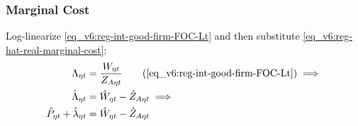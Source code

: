 \documentclass[../thesis.tex]{subfiles}
\begin{document}
\subsubsection*{Marginal Cost}
Log-linearize \ref{eq_v6:reg-int-good-firm-FOC-Lt} and then substitute \ref{eq_v6:reg-hat-real-marginal-cost}:
\begin{align}
	\Lambda_{\eta t} &= \frac{W_{\eta t}}{Z_{A\eta t}} \tag{\ref{eq_v6:reg-int-good-firm-FOC-Lt}} \implies \\
	\hat{\Lambda}_{\eta t} &= \hat{W}_{\eta t} - \hat{Z}_{A\eta t} \implies \nonumber \\
	\hat{P}_{\eta t} + \hat{\lambda}_{\eta t} &= \hat{W}_{\eta t} - \hat{Z}_{A\eta t} \label{eq_v6:reg-int-good-firm-FOC-Lt-ll}
\end{align}



\end{document}
